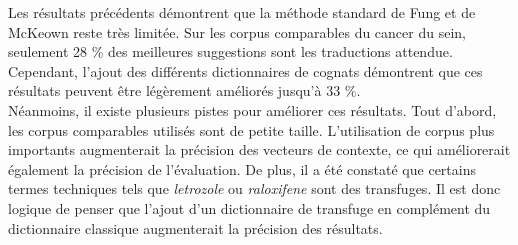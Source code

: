 


Les résultats précédents démontrent que la méthode standard de Fung et de McKeown reste très limitée. Sur les corpus comparables du cancer du sein, seulement 28 \% des meilleures suggestions sont les traductions attendue. Cependant, l'ajout des différents dictionnaires de cognats démontrent que ces résultats peuvent être légèrement améliorés jusqu'à 33 \%.\\
	
	Néanmoins, il existe plusieurs pistes pour améliorer ces résultats. Tout d'abord, les corpus comparables utilisés sont de petite taille. L'utilisation de corpus plus importants augmenterait la précision des vecteurs de contexte, ce qui améliorerait également la précision de l'évaluation. De plus, il a été constaté que certains termes techniques tels que \textit{letrozole} ou \textit{raloxifene} sont des transfuges. Il est donc logique de penser que l'ajout d'un dictionnaire de transfuge en complément du dictionnaire classique augmenterait la précision des résultats.

